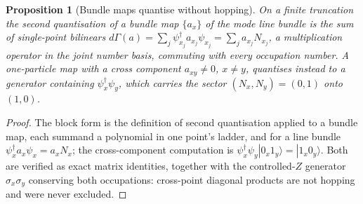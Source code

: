 \documentclass[11pt]{article}
\newtheorem{proposition}[theorem]{Proposition}
\theoremstyle{definition}
\theoremstyle{plain}
\begin{document}
\begin{proposition}[Bundle maps quantise without hopping]\label{c:singularity.bundle-maps-quantise-without-hopping}
On a finite truncation the second quantisation of a bundle map $\{a_x\}$ of the mode line bundle is the sum of single-point bilinears $d\Gamma(a) = \sum_j \psi^{\dagger}_{x_j} a_{x_j} \psi_{x_j} = \sum_j a_{x_j} N_{x_j}$, a multiplication operator in the joint number basis, commuting with every occupation number. A one-particle map with a cross component $a_{xy} \neq 0$, $x \neq y$, quantises instead to a generator containing $\psi^{\dagger}_x\psi_y$, which carries the sector $(N_x, N_y) = (0,1)$ onto $(1,0)$.
\end{proposition}
\begin{proof}
The block form is the definition of second quantisation applied to a bundle map, each summand a polynomial in one point's ladder, and for a line bundle $\psi^{\dagger}_x a_x \psi_x = a_x N_x$; the cross-component computation is $\psi^{\dagger}_x\psi_y|0_x 1_y\rangle = |1_x 0_y\rangle$. Both are verified as exact matrix identities, together with the controlled-$Z$ generator $\sigma_x\sigma_y$ conserving both occupations: cross-point diagonal products are not hopping and were never excluded.

\end{proof}
\end{document}
